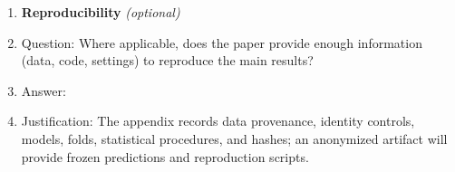\begin{enumerate}
\item {\bf Reproducibility} \emph{(optional)}
  \item[] Question: Where applicable, does the paper provide enough information
  (data, code, settings) to reproduce the main results?
  \item[] Answer: \answerYes{}
  \item[] Justification: The appendix records data provenance, identity controls,
  models, folds, statistical procedures, and hashes; an anonymized artifact will
  provide frozen predictions and reproduction scripts.
\end{enumerate}
